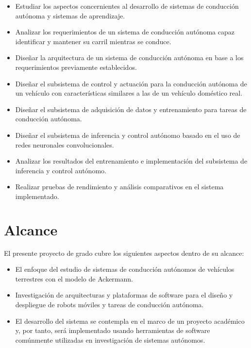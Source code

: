 \begin{itemize}

    \item Estudiar los aspectos concernientes al desarrollo de sistemas de conducción autónoma y sistemas de aprendizaje.
    \item Analizar los requerimientos de un sistema de conducción autónoma capaz identificar y mantener su carril mientras se conduce.
    \item Diseñar la arquitectura de un sistema de conducción autónoma en base a los requerimientos previamente establecidos.
    \item Diseñar el subsistema de control y actuación para la conducción autónoma de un vehículo con características similares a las de un vehículo doméstico real.
    \item Diseñar el subsistema de adquisición de datos y entrenamiento para tareas de conducción autónoma.
    \item Diseñar el subsistema de inferencia y control autónomo basado en el uso de redes neuronales convolucionales.
    \item Analizar los resultados del entrenamiento e implementación del subsistema de inferencia y control autónomo.
    \item Realizar pruebas de rendimiento y análisis comparativos en el sistema implementado.

\end{itemize}


\section{Alcance}

El presente proyecto de grado cubre los siguientes aspectos dentro de su alcance:

\begin{itemize}
    \item El enfoque del estudio de sistemas de conducción autónomos de vehículos terrestres con el modelo de Ackermann.
    \item Investigación de arquitecturas y plataformas de software para el
    diseño y despliegue de robots móviles y tareas de conducción autónoma.
    \item El desarrollo del sistema se contempla en el marco de un proyecto académico 
    y, por tanto, será implementado usando herramientas de software comúnmente utilizadas en 
    investigación de sistemas autónomos.
\end{itemize}

